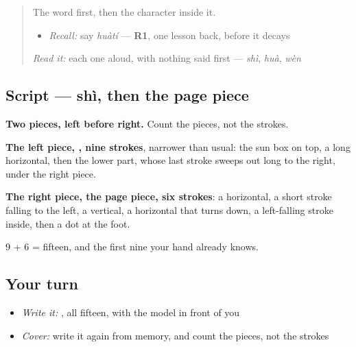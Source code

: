 \begin{quote}
The word first, then the character inside it.

\begin{itemize}
\raggedright
  \item \emph{Recall:} say \emph{huàtí} — \textbf{R1}, one lesson back, before it decays
\end{itemize}

\begin{quote}
  
\end{quote}

\emph{Read it:} each one aloud, with nothing said first — \emph{shì}, \emph{huà}, \emph{wèn}
\end{quote}

\subsection*{Script — shì, then the page piece}

\begin{quote}
\end{quote}

\textbf{Two pieces, left before right.} Count the pieces, not the strokes.

\textbf{The left piece, , nine strokes}, narrower than usual: the sun box on top, a long horizontal, then the lower part, whose last stroke sweeps out long to the right, under the right piece.

\textbf{The right piece, the page piece, six strokes}: a horizontal, a short stroke falling to the left, a vertical, a horizontal that turns down, a left-falling stroke inside, then a dot at the foot.

9 + 6 = fifteen, and the first nine your hand already knows.

\subsection*{Your turn}
\begin{itemize}
\raggedright
  \item \emph{Write it:} , all fifteen, with the model in front of you
  \item \emph{Cover:} write it again from memory, and count the pieces, not the strokes
\end{itemize}

